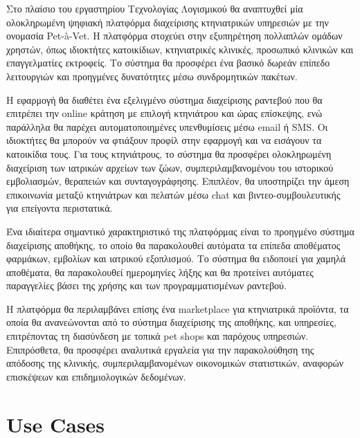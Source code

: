 \documentclass[12pt,a4paper,twoside]{book}
\begin{document}
Στο πλαίσιο του εργαστηρίου Τεχνολογίας Λογισμικού θα αναπτυχθεί μία ολοκληρωμένη ψηφιακή πλατφόρμα διαχείρισης κτηνιατρικών υπηρεσιών με την ονομασία Pet-à-Vet. Η πλατφόρμα στοχεύει στην εξυπηρέτηση πολλαπλών ομάδων χρηστών, όπως ιδιοκτήτες κατοικίδιων, κτηνιατρικές κλινικές, προσωπικό κλινικών και επαγγελματίες εκτροφείς. Το σύστημα θα προσφέρει ένα βασικό δωρεάν επίπεδο λειτουργιών και προηγμένες δυνατότητες μέσω συνδρομητικών πακέτων.

Η εφαρμογή θα διαθέτει ένα εξελιγμένο σύστημα διαχείρισης ραντεβού που θα επιτρέπει την online κράτηση με επιλογή κτηνιάτρου και ώρας επίσκεψης, ενώ παράλληλα θα παρέχει αυτοματοποιημένες υπενθυμίσεις μέσω email ή SMS. Οι ιδιοκτήτες θα μπορούν να φτιάξουν προφίλ στην εφαρμογή και να εισάγουν τα κατοικίδια τους. Για τους κτηνιάτρους, το σύστημα θα προσφέρει ολοκληρωμένη διαχείριση των ιατρικών αρχείων των ζώων, συμπεριλαμβανομένου του ιστορικού εμβολιασμών, θεραπειών και συνταγογράφησης. Επιπλέον, θα υποστηρίζει την άμεση επικοινωνία μεταξύ κτηνιάτρων και πελατών μέσω chat και βιντεο-συμβουλευτικής για επείγοντα περιστατικά.

Ένα ιδιαίτερα σημαντικό χαρακτηριστικό της πλατφόρμας είναι το προηγμένο σύστημα διαχείρισης αποθήκης, το οποίο θα παρακολουθεί αυτόματα τα επίπεδα αποθέματος φαρμάκων, εμβολίων και ιατρικού εξοπλισμού. Το σύστημα θα ειδοποιεί για χαμηλά αποθέματα, θα παρακολουθεί ημερομηνίες λήξης και θα προτείνει αυτόματες παραγγελίες βάσει της χρήσης και των προγραμματισμένων ραντεβού.

Η πλατφόρμα θα περιλαμβάνει επίσης ένα marketplace για κτηνιατρικά προϊόντα, τα οποία θα ανανεώνονται από το σύστημα διαχείρισης της αποθήκης, και υπηρεσίες, επιτρέποντας τη διασύνδεση με τοπικά pet shops και παρόχους υπηρεσιών. Επιπρόσθετα, θα προσφέρει αναλυτικά εργαλεία για την παρακολούθηση της απόδοσης της κλινικής, συμπεριλαμβανομένων οικονομικών στατιστικών, αναφορών επισκέψεων και επιδημιολογικών δεδομένων.


\chapter{Use Cases}
\end{document}

